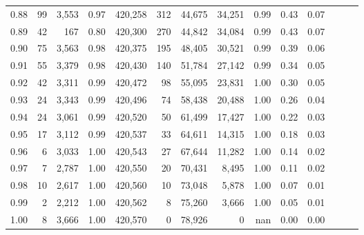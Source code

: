 \begin{tabular}{rrrrrrrrrrrrrr}
0.88 &      99 &  3,553 &  0.97 &  420,258 &      312 &  44,675 &  34,251 &  0.99 &  0.43 &      0.07 \\
0.89 &      42 &    167 &  0.80 &  420,300 &      270 &  44,842 &  34,084 &  0.99 &  0.43 &      0.07 \\
0.90 &      75 &  3,563 &  0.98 &  420,375 &      195 &  48,405 &  30,521 &  0.99 &  0.39 &      0.06 \\
0.91 &      55 &  3,379 &  0.98 &  420,430 &      140 &  51,784 &  27,142 &  0.99 &  0.34 &      0.05 \\
0.92 &      42 &  3,311 &  0.99 &  420,472 &       98 &  55,095 &  23,831 &  1.00 &  0.30 &      0.05 \\
0.93 &      24 &  3,343 &  0.99 &  420,496 &       74 &  58,438 &  20,488 &  1.00 &  0.26 &      0.04 \\
0.94 &      24 &  3,061 &  0.99 &  420,520 &       50 &  61,499 &  17,427 &  1.00 &  0.22 &      0.03 \\
0.95 &      17 &  3,112 &  0.99 &  420,537 &       33 &  64,611 &  14,315 &  1.00 &  0.18 &      0.03 \\
0.96 &       6 &  3,033 &  1.00 &  420,543 &       27 &  67,644 &  11,282 &  1.00 &  0.14 &      0.02 \\
0.97 &       7 &  2,787 &  1.00 &  420,550 &       20 &  70,431 &   8,495 &  1.00 &  0.11 &      0.02 \\
0.98 &      10 &  2,617 &  1.00 &  420,560 &       10 &  73,048 &   5,878 &  1.00 &  0.07 &      0.01 \\
0.99 &       2 &  2,212 &  1.00 &  420,562 &        8 &  75,260 &   3,666 &  1.00 &  0.05 &      0.01 \\
1.00 &       8 &  3,666 &  1.00 &  420,570 &        0 &  78,926 &       0 &   nan &  0.00 &      0.00 \\
\bottomrule
\end{tabular}
